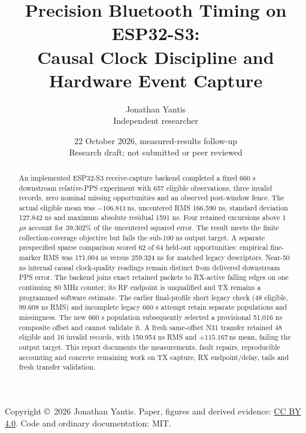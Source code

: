 \documentclass[10pt,letterpaper]{article}
\newcommand{\ns}{\,\mathrm{ns}}\newcommand{\us}{\,\mu\mathrm{s}}\newcommand{\code}[1]{\texttt{#1}}\newcolumntype{L}[1]{>{\RaggedRight\arraybackslash}p{#1}}\renewcommand{\arraystretch}{1.15}
\begin{document}
\title{\vspace{-1.5em}Precision Bluetooth Timing on ESP32-S3:\\Causal Clock Discipline and Hardware Event Capture}
\author{Jonathan Yantis\\\small Independent researcher}
\date{22 October 2026, measured-results follow-up\\\small Research draft; not submitted or peer reviewed}
\maketitle\vspace{-1em}
\begin{abstract}
An implemented ESP32-S3 receive-capture backend completed a fixed 660 s downstream relative-PPS experiment with 657 eligible observations, three invalid records, zero nominal missing opportunities and an observed post-window fence. The actual eligible mean was $-106.811\ns$, uncentered RMS 166.590 ns, standard deviation 127.842 ns and maximum absolute residual 1591 ns. Four retained excursions above 1 $\mu$s account for 39.302\% of the uncentered squared error. The result meets the finite collection-coverage objective but fails the sub-100 ns output target. A separate prespecified sparse comparison scored 62 of 64 held-out opportunities: empirical fine-marker RMS was 171.004 ns versus 259.324 ns for matched legacy descriptors. Near-50 ns internal causal clock-quality readings remain distinct from delivered downstream PPS error. The backend joins exact retained packets to RX-active falling edges on one continuing 80 MHz counter; its RF endpoint is unqualified and TX remains a programmed software estimate. The earlier final-profile short legacy check (48 eligible, 99.608 ns RMS) and incomplete legacy 660 s attempt retain separate populations and missingness. The new 660 s population subsequently selected a provisional 51,016 ns composite offset and cannot validate it. A fresh same-offset N31 transfer retained 48 eligible and 16 invalid records, with 150.954 ns RMS and $+115.167\ns$ mean, failing the output target. This report documents the measurements, fault repairs, reproducible accounting and concrete remaining work on TX capture, RX endpoint/delay, tails and fresh transfer validation.
\end{abstract}
\noindent\footnotesize Copyright \copyright\ 2026 Jonathan Yantis. Paper, figures and derived evidence: \href{https://creativecommons.org/licenses/by/4.0/}{CC BY 4.0}. Code and ordinary documentation: MIT.\normalsize
\end{document}

